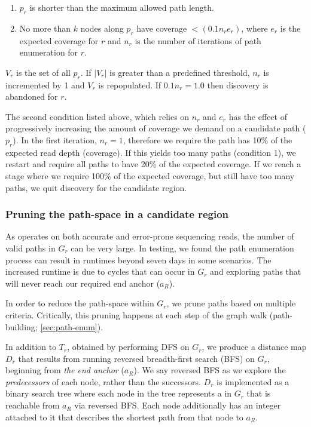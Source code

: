 \begin{enumerate}
  \item $p_r$ is shorter than the maximum allowed path length.
  \item No more than $k$ nodes along $p_r$ have coverage $< (0.1 n_r e_r)$, where $e_r$ is the expected \kmer{} coverage for $r$ and $n_r$ is the number of iterations of path enumeration for $r$.
\end{enumerate}

$V_r$ is the set of all $p_r$. If $|V_r|$ is greater than a predefined threshold, $n_r$ is incremented by 1 and $V_r$ is repopulated. If $0.1n_r = 1.0$ then \denovo{} discovery is abandoned for $r$.

The second condition listed above, which relies on $n_r$ and $e_r$ has the effect of progressively increasing the amount of coverage we demand on a candidate path ($p_r$). In the first iteration, $n_r=1$, therefore we require the path has 10\% of the expected read depth (coverage). If this yields too many paths (condition 1), we restart and require all paths to have 20\% of the expected coverage. If we reach a stage where we require 100\% of the expected coverage, but still have too many paths, we quit \denovo{} discovery for the candidate region.

\subsubsection{Pruning the path-space in a candidate region}
\label{sec:denovo-prune}

As \pandora{} operates on both accurate and error-prone sequencing reads, the number of valid paths in $G_r$ can be very large. In testing, we found the path enumeration process can result in runtimes beyond seven days in some scenarios. The increased runtime is due to cycles that can occur in $G_r$ and exploring paths that will never reach our required end anchor ($a_R$). 

In order to reduce the path-space within $G_r$, we prune paths based on multiple criteria. Critically, this pruning happens at each step of the graph walk (path-building; \autoref{sec:path-enum}).

In addition to $T_r$, obtained by performing DFS on $G_r$, we produce a distance map $D_r$ that results from running reversed breadth-first search (BFS) on $G_r$, beginning from \emph{the end anchor} ($a_R$). We say reversed BFS as we explore the \emph{predecessors} of each node, rather than the successors. $D_r$ is implemented as a binary search tree where each node in the tree represents a \kmer{} in $G_r$ that is reachable from $a_R$ via reversed BFS. Each node additionally has an integer attached to it that describes the shortest path from that node to $a_R$.

